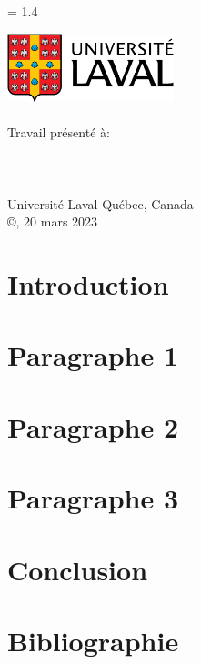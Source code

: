\documentclass[
  12pt,
]{article}
\author{}
\date{\vspace{-2.5em}}
\begin{document}
\begin{titlepage}
  \newpage
  \let\footnotesize\small
  \let\footnoterule\relax
  \let \footnote \thanks

  \baselineskip = 1.4\baselineskip

  \begin{center}
    \setcounter{page}{1}
    \includegraphics[height=20mm,keepaspectratio=true]{figures/logoULaval/ul_p}
    \null\vfil
    {\fontsize{16}{14}\selectfont \textbf{\@titre}}
    \vfil
    \textbf{\@auteur} \\\@ni
    \vfil
    \@projet \\\@cours
    \vfil
    Travail présenté à:\\
    \textbf{\@professeur} \\
    \vfil
    \@departement\\\@faculte\\Université Laval
    \vfil
    \vfil
    Québec, Canada \\
    \vfil
    \copyright \thinspace \@auteur, 20 mars 2023 \\
  \end{center}\par
\end{titlepage}

\hypertarget{introduction}{%
\section{Introduction}\label{introduction}}

\hypertarget{paragraphe-1}{%
\section{Paragraphe 1}\label{paragraphe-1}}

\hypertarget{paragraphe-2}{%
\section{Paragraphe 2}\label{paragraphe-2}}

\hypertarget{paragraphe-3}{%
\section{Paragraphe 3}\label{paragraphe-3}}

\hypertarget{conclusion}{%
\section{Conclusion}\label{conclusion}}

\hypertarget{bibliographie}{%
\section{Bibliographie}\label{bibliographie}}
\end{document}
